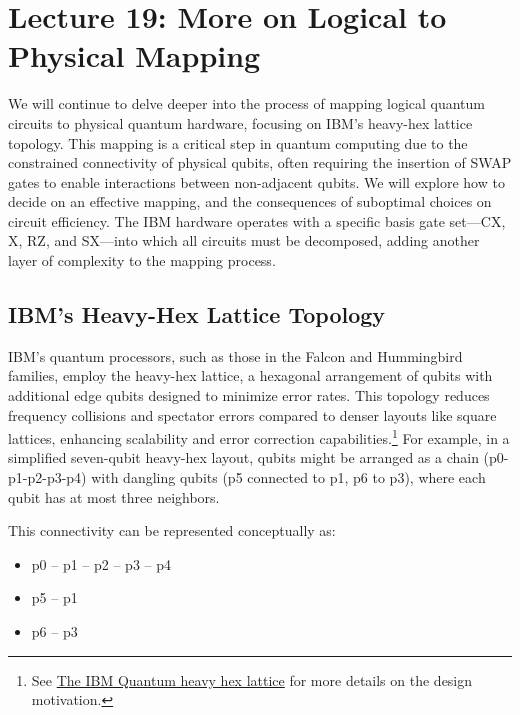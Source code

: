 \section{Lecture 19: More on Logical to Physical Mapping}\label{sec:lecture19}

We will continue to delve deeper into the process of mapping logical quantum
circuits to physical quantum hardware, focusing on IBM's heavy-hex lattice
topology. This mapping is a critical step in quantum computing due to the
constrained connectivity of physical qubits, often requiring the insertion of
SWAP gates to enable interactions between non-adjacent qubits. We will
explore how to decide on an effective mapping, and the consequences of
suboptimal choices on circuit efficiency. The IBM hardware operates with a
specific basis gate set—CX, X, RZ, and SX—into which all circuits must be
decomposed, adding another layer of complexity to the mapping process.

\subsection*{IBM's Heavy-Hex Lattice Topology}

IBM's quantum processors, such as those in the Falcon and Hummingbird
families, employ the heavy-hex lattice, a hexagonal arrangement of qubits
with additional edge qubits designed to minimize error rates. This topology
reduces frequency collisions and spectator errors compared to denser layouts
like square lattices, enhancing scalability and error correction
capabilities.\footnote{See \href{https://www.ibm.com/quantum/blog/heavy-hex-lattice}
{The IBM Quantum heavy hex lattice} for more details on the design motivation.}
For example, in a simplified seven-qubit heavy-hex layout, qubits might be
arranged as a chain (p0-p1-p2-p3-p4) with dangling qubits (p5 connected to
p1, p6 to p3), where each qubit has at most three neighbors.

\vspace{0.3cm}

\noindent
This connectivity can be represented conceptually as:

\begin{itemize}
  \item p0 -- p1 -- p2 -- p3 -- p4
  \item p5 -- p1
  \item p6 -- p3
\end{itemize}

\vspace{0.3cm}

